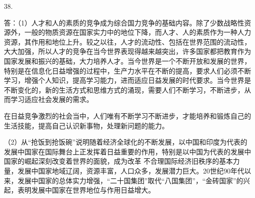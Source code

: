 \documentclass[a4paper]{article}
\begin{document}
38.

答：（1）人才和人的素质的竞争成为综合国力竞争的基础内容。除了少数战略性资源外，一般的物质资源在国家实力中的地位下降，而人才、人的素质作为一种人力资源，其作用和地位上升。较之以往，人才的流动性、包括在世界范围的流动性，大大加强，所以人才的竞争在当今世界表现得越来越突出，许多国家都把教育作为国家发展和振兴的基础，大力培养人才。当今世界是一个不断开放和发展的世界，特别是在信息化日益增强的过程中，生产力水平在不断的提高，要求人们必须不断学习，增强个人知识，提高学习能力，进而适应日益发展的时代要求。当今世界是不断变化的，新的生活方式和思维方式的涌现，需要人们不断学习，不断进步，从而学习适应社会发展的需求。

在日益竞争激烈的社会当中，人们唯有不断学习不断进步，才能培养和锻炼自己的生活技能，提高自己认识新事物，处理新问题的能力。

（2）从“抢饭到抢饭碗”说明随着经济全球化的不断发展，以中国和印度为代表的发展中国家在国际舞台上正发挥着日益重要的作用，特别是以中国为代表的发展中国家的崛起深刻改变着世界的面貌，成为改革 不合理国际经济旧秩序的基本力量，发展中国家地域辽阔，资源丰富，人口众多，发展潜力巨大。20世纪90年代以来，发展中国家的总体实力增强，“二十国集团”取代“八国集团”，“金砖国家”的兴起，表明发展中国家在世界地位与作用日益增大。
\end{document}
